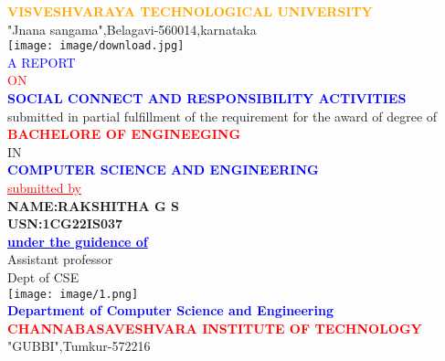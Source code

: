 \documentclass[12pt,a4paper]{article}
\begin{document}
    \begin{center}
        \textcolor{orange}{\large\textbf{VISVESHVARAYA TECHNOLOGICAL UNIVERSITY}}\\{"Jnana sangama",Belagavi-560014,karnataka}\\
        \vspace{9mm}
        \texttt{[image: image/download.jpg]}\\
        \vspace{9mm}
        \textcolor{blue}{A REPORT}\\
        \textcolor{red}{ON}\\
        \textcolor{blue}{\textbf{SOCIAL CONNECT AND RESPONSIBILITY ACTIVITIES}}\\
        \small{submitted in partial fulfillment of the requirement for the award of degree of}\\
        \vspace{5mm}
        \textcolor{red}{\textbf{BACHELORE OF ENGINEEGING}}\\
        IN\\
        \textcolor{blue}{\textbf{COMPUTER SCIENCE AND ENGINEERING}}\\
        \vspace{9mm}
        \textcolor{red}{\underline{submitted by}}\\
        \vspace{4mm}
        \textbf{NAME:RAKSHITHA G S}\\
        \textbf{USN:1CG22IS037}\\
        \vspace{9mm}
        \textcolor{blue}{\underline{{\textbf{under the guidence of}}}}\\
        Assistant professor\\
        Dept of CSE\\
        \centering\texttt{[image: image/1.png]}\\
        \textcolor{blue}{\textbf{Department of Computer Science and Engineering}}\\
        \textcolor{red}{\textbf{CHANNABASAVESHVARA INSTITUTE OF TECHNOLOGY}}\\{"GUBBI",Tumkur-572216}\\
        \end{center}
\end{document}
